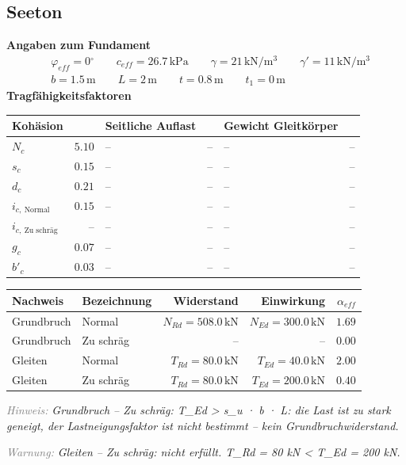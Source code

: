 \documentclass[11pt,a4paper]{article}
\newcommand{\hinweis}[2]{\par\noindent\textcolor{gray}{\textit{#1:}} \textit{#2}\par}
\begin{document}
\subsection{Seeton}
\noindent\textbf{Angaben zum Fundament}
\begin{equation*}
\begin{aligned} & \varphi_{eff} = 0{}^{\circ} \qquad c_{eff} = 26.7\,\mathrm{kPa} \qquad \gamma = 21\,\mathrm{kN}/\mathrm{m}^{3} \qquad \gamma' = 11\,\mathrm{kN}/\mathrm{m}^{3} \\ & b = 1.5\,\mathrm{m} \qquad L = 2\,\mathrm{m} \qquad t = 0.8\,\mathrm{m} \qquad t_1 = 0\,\mathrm{m} \end{aligned}
\end{equation*}
\noindent\textbf{Tragfähigkeitsfaktoren}
\begin{longtable}{lrlrlr}
\hline
Kohäsion &  & Seitliche Auflast &  & Gewicht Gleitkörper &  \\
\hline
\endhead
$N_{c}$ & $5.10$ & – & – & – & – \\
$s_{c}$ & $0.15$ & – & – & – & – \\
$d_{c}$ & $0.21$ & – & – & – & – \\
$i_{c,\ \text{Normal}}$ & $0.15$ & – & – & – & – \\
$i_{c,\ \text{Zu schräg}}$ & – & – & – & – & – \\
$g_{c}$ & $0.07$ & – & – & – & – \\
$b'_{c}$ & $0.03$ & – & – & – & – \\
\hline
\end{longtable}
\begin{xltabular}{\linewidth}{>{\raggedright\arraybackslash}X>{\raggedright\arraybackslash}Xrrr}
\hline
Nachweis & Bezeichnung & Widerstand & Einwirkung & $\alpha_{eff}$ \\
\hline
\endhead
Grundbruch & Normal & $N_{Rd} = 508.0\,\mathrm{kN}$ & $N_{Ed} = 300.0\,\mathrm{kN}$ & $1.69$ \\
Grundbruch & Zu schräg & – & – & $0.00$ \\
Gleiten & Normal & $T_{Rd} = 80.0\,\mathrm{kN}$ & $T_{Ed} = 40.0\,\mathrm{kN}$ & $2.00$ \\
Gleiten & Zu schräg & $T_{Rd} = 80.0\,\mathrm{kN}$ & $T_{Ed} = 200.0\,\mathrm{kN}$ & $0.40$ \\
\hline
\end{xltabular}
\hinweis{Hinweis}{Grundbruch – Zu schräg: T\_Ed > s\_u · b · L: die Last ist zu stark geneigt, der Lastneigungsfaktor ist nicht bestimmt -- kein Grundbruchwiderstand.}
\hinweis{Warnung}{Gleiten – Zu schräg: nicht erfüllt. T\_Rd = 80 kN < T\_Ed = 200 kN.}
\end{document}
